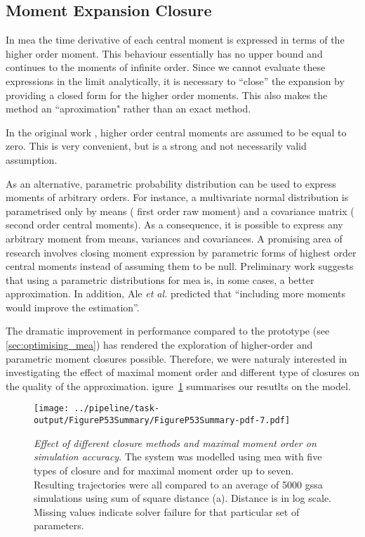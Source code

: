 \subsection{Moment Expansion Closure}

In \gls{mea} the time derivative of each central moment is expressed in terms of the higher order moment. 
This behaviour essentially has no upper bound and continues to the moments of infinite order. 
Since we cannot evaluate these expressions in the limit analytically, it is necessary to ``close'' the expansion by providing a closed form for the higher order moments.
This also makes the method an ``aproximation" rather than an exact method.

In the original work \cite{ale_general_2013}, higher order central moments are assumed to be equal to zero.
This is very convenient, but is a strong and not necessarily valid assumption. 

As an alternative, parametric probability distribution can be used to express moments of arbitrary orders. 
For instance, a multivariate normal distribution is parametrised only by means (\ie{} first order raw moment)
and a covariance matrix (\ie{} second order central moments). 
As a consequence, it is possible to express any arbitrary moment from means, variances and covariances. 
A promising area of research involves closing moment expression by parametric forms of highest order central moments instead
of assuming them to be null.
Preliminary work  suggests that using a parametric distributions for \gls{mea} is, in some cases, a better approximation.
In addition, Ale \emph{et al.} predicted that ``including more moments would improve the estimation''\cite{ale_general_2013}.

The dramatic improvement in performance compared to the \mat{} prototype (see \autoref{sec:optimising_mea}) has rendered the exploration of higher-order and parametric moment closures possible.
Therefore, we were naturaly interested in investigating the effect of maximal moment order and different type of closures on the quality of the approximation.
igure~\ref{fig:max_order_and_closure_on_distance_summary} summarises our resutlts on the \pft{} model.

\begin{figure}[t]
    \centering
    \texttt{[image: ../pipeline/task-output/FigureP53Summary/FigureP53Summary-pdf-7.pdf]}
    \caption{\emph{Effect of different closure methods and maximal moment order on simulation accuracy}. The \pft system was modelled using \gls{mea} with five types of closure and for maximal moment order up to seven.
Resulting trajectories were all compared to an average of 5000 \gls{gssa} simulations using sum of square distance (a).
Distance is in log scale. Missing values indicate solver failure for that particular set of parameters.}
    \label{fig:max_order_and_closure_on_distance_summary}
\end{figure}

